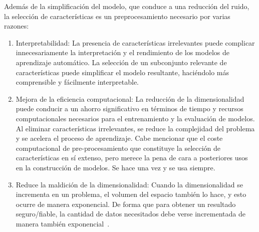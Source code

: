 Además de la simplificación del modelo, que conduce a una reducción del ruido, la
selección de características es un preprocesamiento necesario por varias razones:
\begin{enumerate}
      \item Interpretabilidad: La presencia de características
            irrelevantes puede complicar innecesariamente la interpretación y el
            rendimiento de los modelos de aprendizaje automático. La selección de un
            subconjunto relevante de características puede simplificar el modelo
            resultante, haciéndolo más comprensible y fácilmente interpretable.

      \item Mejora de la eficiencia computacional: La reducción de la
            dimensionalidad puede conducir a un ahorro significativo en términos de
            tiempo y recursos computacionales necesarios para el entrenamiento y la
            evaluación de modelos. Al eliminar características irrelevantes, se reduce
            la complejidad del problema y se acelera el proceso de aprendizaje. Cabe mencionar que el coste computacional de pre-procesamiento que constituye la selección de características en sí extenso, pero merece la pena de cara a posteriores usos en la construcción de modelos. Se hace una vez y se usa siempre.

      \item Reduce la maldición de la dimensionalidad: Cuando la dimensionalidad
            se incrementa en un problema, el volumen del espacio también lo hace, y esto ocurre de manera exponencial. De forma que para
            obtener un resultado seguro/fiable, la cantidad de datos necesitados debe verse incrementada de manera también exponencial~\cite{udacity2015curse}.
\end{enumerate}

